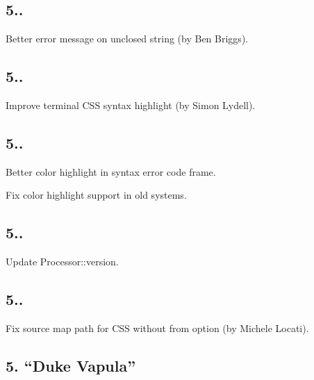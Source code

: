 \subsection*{5..}


\begin{DoxyItemize}
\item Better error message on unclosed string (by Ben Briggs).
\end{DoxyItemize}

\subsection*{5..}


\begin{DoxyItemize}
\item Improve terminal C\+SS syntax highlight (by Simon Lydell).
\end{DoxyItemize}

\subsection*{5..}


\begin{DoxyItemize}
\item Better color highlight in syntax error code frame.
\item Fix color highlight support in old systems.
\end{DoxyItemize}

\subsection*{5..}


\begin{DoxyItemize}
\item Update {\ttfamily Processor\+::version}.
\end{DoxyItemize}

\subsection*{5..}


\begin{DoxyItemize}
\item Fix source map path for C\+SS without {\ttfamily from} option (by Michele Locati).
\end{DoxyItemize}

\subsection*{5. “\+Duke Vapula”}


